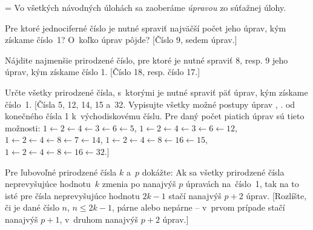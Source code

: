 {%

{\everypar={}
Vo všetkých návodných úlohách sa zaoberáme {\it úpravou\/}
zo súťažnej úlohy.\par}

Pre ktoré jednociferné číslo je nutné spraviť najväčší
počet jeho úprav, kým získame číslo~1? O~koľko úprav pôjde? [Číslo 9,
sedem úprav.]

Nájdite najmenšie prirodzené číslo, pre ktoré je nutné
spraviť 8, resp. 9 jeho úprav, kým získame číslo 1. [Číslo 18,
resp. číslo 17.]

Určte všetky prirodzené čísla, s~ktorými je nutné spraviť
päť úprav, kým získame číslo~1. [Čísla 5, 12, 14, 15 a~32.
Vypisujte všetky možné postupy úprav , \tj. od
konečného čísla 1 k~východiskovému číslu. Pre daný počet piatich úprav
sú tieto možnosti:
$1\gets2\gets4\gets3\gets6\gets5$,
$1\gets2\gets4\gets3\gets6\gets12$,
$1\gets2\gets4\gets8\gets7\gets14$,
$1\gets2\gets4\gets8\gets16\gets15$,
$1\gets2\gets4\gets8\gets16\gets32$.]

Pre ľubovoľné prirodzené čísla $k$ a~$p$ dokážte: Ak
sa všetky prirodzené čísla neprevyšujúce hodnotu~$k$ zmenia po
nanajvýš $p$ úpravách na~číslo~1, tak na to isté pre čísla
neprevyšujúce hodnotu $2k-1$ stačí nanajvýš $p+2$ úprav.
[Rozlíšte, či je dané číslo $n$, $n\le2k-1$, párne alebo
nepárne -- v~prvom prípade stačí nanajvýš $p+1$, v~druhom nanajvýš $p+2$ úprav.]

}
